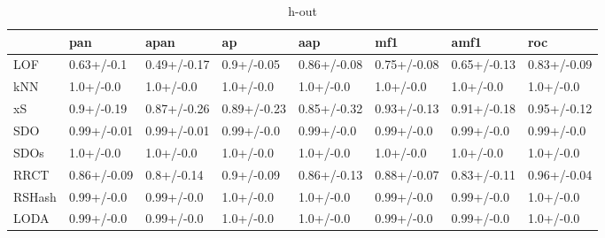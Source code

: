 \begin{table}
\centering
\caption{h-out}
\begin{tabular}{llllllll}
\toprule
{} &          pan &         apan &           ap &          aap &          mf1 &         amf1 &          roc \\
\midrule
LOF    &   0.63+/-0.1 &  0.49+/-0.17 &   0.9+/-0.05 &  0.86+/-0.08 &  0.75+/-0.08 &  0.65+/-0.13 &  0.83+/-0.09 \\
kNN    &    1.0+/-0.0 &    1.0+/-0.0 &    1.0+/-0.0 &    1.0+/-0.0 &    1.0+/-0.0 &    1.0+/-0.0 &    1.0+/-0.0 \\
xS     &   0.9+/-0.19 &  0.87+/-0.26 &  0.89+/-0.23 &  0.85+/-0.32 &  0.93+/-0.13 &  0.91+/-0.18 &  0.95+/-0.12 \\
SDO    &  0.99+/-0.01 &  0.99+/-0.01 &   0.99+/-0.0 &   0.99+/-0.0 &   0.99+/-0.0 &   0.99+/-0.0 &   0.99+/-0.0 \\
SDOs   &    1.0+/-0.0 &    1.0+/-0.0 &    1.0+/-0.0 &    1.0+/-0.0 &    1.0+/-0.0 &    1.0+/-0.0 &    1.0+/-0.0 \\
RRCT   &  0.86+/-0.09 &   0.8+/-0.14 &   0.9+/-0.09 &  0.86+/-0.13 &  0.88+/-0.07 &  0.83+/-0.11 &  0.96+/-0.04 \\
RSHash &   0.99+/-0.0 &   0.99+/-0.0 &    1.0+/-0.0 &    1.0+/-0.0 &   0.99+/-0.0 &   0.99+/-0.0 &    1.0+/-0.0 \\
LODA   &   0.99+/-0.0 &   0.99+/-0.0 &    1.0+/-0.0 &    1.0+/-0.0 &   0.99+/-0.0 &   0.99+/-0.0 &    1.0+/-0.0 \\
\bottomrule
\end{tabular}
\end{table}
